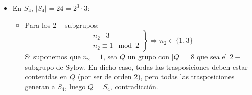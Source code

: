 \begin{ejemplo}
\begin{itemize}
\begin{itemize}
\begin{itemize}
                    \end{itemize}
                \item En $S_4$, $|S_4| = 24 = 2^3 \cdot 3$:
                    \begin{itemize}
                        \item Para los $2-$subgrupos:
                            \begin{equation*}
                                \left.\begin{array}{r}
                                    n_2 \mid 3 \\
                                    n_2 \equiv 1 \mod 2
                                \end{array}\right\} \Longrightarrow n_2 \in \{1,3\}
                            \end{equation*}
                            Si suponemos que $n_2 = 1$, sea $Q$ un grupo con $|Q| = 8$ que sea el $2-$subgrupo de Sylow. En dicho caso, todas las trasposiciones deben estar contenidas en $Q$ (por ser de orden 2), pero todas las trasposiciones generan a $S_4$, luego $Q = S_4$, \underline{contradicción}. 


\end{itemize}
\end{itemize}
\end{itemize}
\end{ejemplo}
